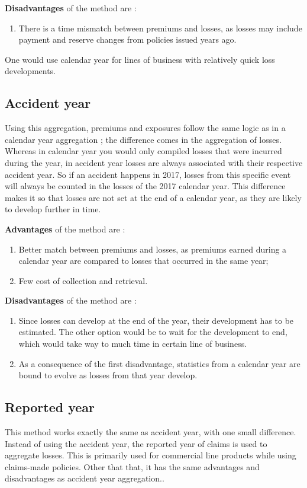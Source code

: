 \documentclass[11pt, english]{memoir}
\numberwithin{definition}{section}
\begin{document}
	\textbf{Disadvantages} of the method are : 
	\begin{enumerate}
		\item There is a time mismatch between premiums and losses, as losses may include payment and reserve changes from policies issued years ago. 
	\end{enumerate}
	
	One would use calendar year for lines of business with relatively quick loss developments. 
	
	
	\subsection{Accident year}
	Using this aggregation, premiums and exposures follow the same logic as in a calendar year aggregation ; the difference comes in the aggregation of losses. Whereas in calendar year you would only compiled losses that were incurred during the year, in accident year losses are always associated with their respective accident year. So if an accident happens in 2017, losses from this specific event will always be counted in the losses of the 2017 calendar year. This difference makes it so that losses are not set at the end of a calendar year, as they are likely to develop further in time.
	
	\textbf{Advantages} of the method are :
	\begin{enumerate}
		\item Better match between premiums and losses, as premiums earned during a calendar year are compared to losses that occurred in the same year;
		\item Few cost of collection and retrieval.
	\end{enumerate}
	
	\textbf{Disadvantages} of the method are : 
	\begin{enumerate}
		\item Since losses can develop at the end of the year, their development has to be estimated. The other option would be to wait for the development to end, which would take way to much time in certain line of business. 
		\item As a consequence of the first disadvantage, statistics from a calendar year are bound to evolve as losses from that year develop. 
	\end{enumerate}
	
	
	
	\subsection{Reported year}
	This method works exactly the same as accident year, with one small difference. Instead of using the accident year, the reported year of claims is used to aggregate losses. This is primarily used for commercial line products while using claims-made policies. Other that that, it has the same advantages and disadvantages as accident year aggregation.. 
	
\end{document}
